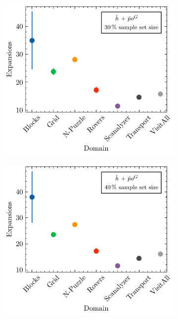 \documentclass[ppgc,diss,english]{iiufrgs}
\begin{document}
\begin{figure}
  \vspace{0.5cm}

  \begin{subfigure}{0.41\textwidth}
    \centering
    \includegraphics[width=\linewidth]{img/error_hNN_poG_30pct.pdf}
  \end{subfigure}
  \begin{subfigure}{0.41\textwidth}
    \centering
    \includegraphics[width=\linewidth]{img/error_hNN_poG_40pct.pdf}
  \end{subfigure}


\end{figure}
\end{document}
